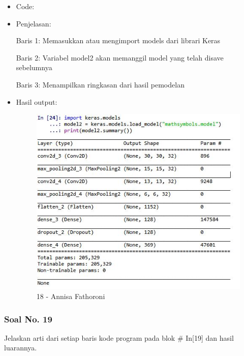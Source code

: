 \begin{itemize}
\item Code:


\item Penjelasan:

Baris 1: Memasukkan atau mengimport models dari librari Keras

Baris 2: Variabel model2 akan memanggil model yang telah disave sebelumnya

Baris 3: Menampilkan ringkasan dari hasil pemodelan

\item Hasil output:

\begin{figure}[!hbtp]
\centering
\includegraphics[scale=0.7]{figures/Chapter 7/1164067/Praktek/Chapter7AnnisaFathoroni18.jpg}
\caption{18 - Annisa Fathoroni}
\label{18 - Annisa Fathoroni}
\end{figure}

\end{itemize}

\subsubsection{Soal No. 19}
Jelaskan arti dari setiap baris kode program pada blok \# In[19] dan hasil luarannya.


